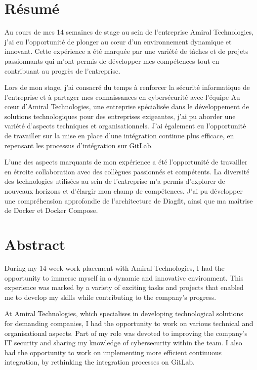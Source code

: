 \section*{Résumé}
Au cours de mes 14 semaines de stage au sein de l'entreprise Amiral Technologies, j'ai eu l'opportunité de plonger au cœur d'un environnement dynamique et innovant.
Cette expérience a été marquée par une variété de tâches et de projets passionnants qui m'ont permis de développer mes compétences tout en contribuant au progrès de l'entreprise.


Lors de mon stage, j'ai consacré du temps à renforcer la sécurité informatique de l'entreprise et à partager mes connaissances en cybersécurité avec l'équipe
Au cœur d'Amiral Technologies, une entreprise spécialisée dans le développement de solutions technologiques pour des entreprises exigeantes, j'ai pu aborder une variété d'aspects techniques et organisationnels.
J'ai également eu l'opportunité de travailler sur la mise en place d'une intégration continue plus efficace, en repensant les processus d'intégration sur GitLab.

L'une des aspects marquants de mon expérience a été l'opportunité de travailler en étroite collaboration avec des collègues passionnés et compétents.
La diversité des technologies utilisées au sein de l'entreprise m'a permis d'explorer de nouveaux horizons et d'élargir mon champ de compétences.
J'ai pu développer une compréhension approfondie de l'architecture de Diagfit, ainsi que ma maîtrise de Docker et Docker Compose.

\section*{Abstract}
During my 14-week work placement with Amiral Technologies, I had the opportunity to immerse myself in a dynamic and innovative environment.
This experience was marked by a variety of exciting tasks and projects that enabled me to develop my skills while contributing to the company's progress.

At Amiral Technologies, which specialises in developing technological solutions for demanding companies, I had the opportunity to work on various technical and organisational aspects.
Part of my role was devoted to improving the company's IT security and sharing my knowledge of cybersecurity within the team.
I also had the opportunity to work on implementing more efficient continuous integration, by rethinking the integration processes on GitLab.

